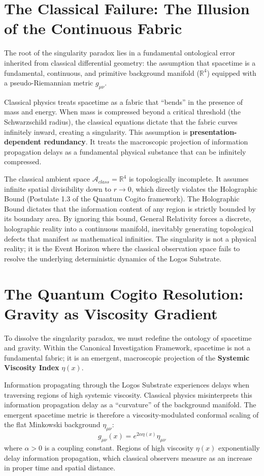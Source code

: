 \documentclass[12pt,twoside]{extbook}
\theoremstyle{definition}
\theoremstyle{remark}
\newcommand{\term}[1]{\textcolor{brandPrimary}{\textbf{#1}}}
\begin{document}
\section{The Classical Failure: The Illusion of the Continuous Fabric}
The root of the singularity paradox lies in a fundamental ontological error inherited from classical differential geometry: the assumption that spacetime is a fundamental, continuous, and primitive background manifold ($\mathbb{R}^4$) equipped with a pseudo-Riemannian metric $g_{\mu\nu}$. 

Classical physics treats spacetime as a fabric that ``bends'' in the presence of mass and energy. When mass is compressed beyond a critical threshold (the Schwarzschild radius), the classical equations dictate that the fabric curves infinitely inward, creating a singularity. This assumption is \term{presentation-dependent redundancy}. It treats the macroscopic projection of information propagation delays as a fundamental physical substance that can be infinitely compressed. 

The classical ambient space $\mathcal{A}_{class} = \mathbb{R}^4$ is topologically incomplete. It assumes infinite spatial divisibility down to $r \to 0$, which directly violates the Holographic Bound (Postulate 1.3 of the Quantum Cogito framework). The Holographic Bound dictates that the information content of any region is strictly bounded by its boundary area. By ignoring this bound, General Relativity forces a discrete, holographic reality into a continuous manifold, inevitably generating topological defects that manifest as mathematical infinities. The singularity is not a physical reality; it is the Event Horizon where the classical observation space fails to resolve the underlying deterministic dynamics of the Logos Substrate.

\section{The Quantum Cogito Resolution: Gravity as Viscosity Gradient}
To dissolve the singularity paradox, we must redefine the ontology of spacetime and gravity. Within the Canonical Investigation Framework, spacetime is not a fundamental fabric; it is an emergent, macroscopic projection of the \term{Systemic Viscosity Index} $\eta(x)$. 

Information propagating through the Logos Substrate experiences delays when traversing regions of high systemic viscosity. Classical physics misinterprets this information propagation delay as a ``curvature'' of the background manifold. The emergent spacetime metric is therefore a viscosity-modulated conformal scaling of the flat Minkowski background $\eta_{\mu\nu}$:
\begin{equation}
g_{\mu\nu}(x) = e^{2\alpha\eta(x)}\eta_{\mu\nu}
\end{equation}
where $\alpha > 0$ is a coupling constant. Regions of high viscosity $\eta(x)$ exponentially delay information propagation, which classical observers measure as an increase in proper time and spatial distance.
\end{document}
